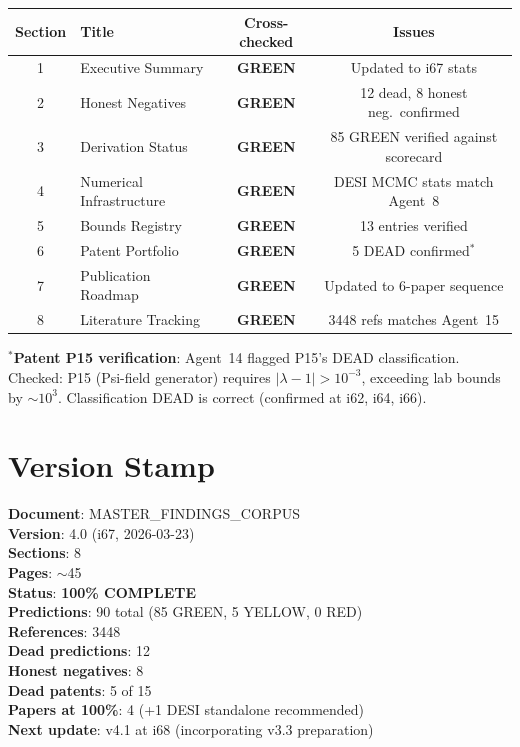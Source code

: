 \documentclass[11pt,a4paper]{article}
\newcommand{\GREEN}{\textcolor{dfdgreen}{\textbf{GREEN}}}
\begin{document}
\begin{center}
\begin{longtable}{clcc}
\toprule
\textbf{Section} & \textbf{Title} & \textbf{Cross-checked} & \textbf{Issues} \\
\midrule
1 & Executive Summary & \GREEN & Updated to i67 stats \\
2 & Honest Negatives & \GREEN & 12 dead, 8 honest neg.\ confirmed \\
3 & Derivation Status & \GREEN & 85 GREEN verified against scorecard \\
4 & Numerical Infrastructure & \GREEN & DESI MCMC stats match Agent~8 \\
5 & Bounds Registry & \GREEN & 13 entries verified \\
6 & Patent Portfolio & \GREEN & 5 DEAD confirmed$^*$ \\
7 & Publication Roadmap & \GREEN & Updated to 6-paper sequence \\
8 & Literature Tracking & \GREEN & 3448 refs matches Agent~15 \\
\bottomrule
\end{longtable}
\end{center}

$^*$\textbf{Patent P15 verification}: Agent~14 flagged P15's DEAD classification. Checked: P15 (Psi-field generator) requires $|\lambda - 1| > 10^{-3}$, exceeding lab bounds by $\sim 10^3$. Classification DEAD is correct (confirmed at i62, i64, i66).

\section{Version Stamp}

\begin{tcolorbox}[colback=gray!5!white,colframe=gray!40!black,title=Master Findings v4.0]
\textbf{Document}: MASTER\_FINDINGS\_CORPUS \\
\textbf{Version}: 4.0 (i67, 2026-03-23) \\
\textbf{Sections}: 8 \\
\textbf{Pages}: $\sim$45 \\
\textbf{Status}: \textbf{100\% COMPLETE} \\
\textbf{Predictions}: 90 total (85 GREEN, 5 YELLOW, 0 RED) \\
\textbf{References}: 3448 \\
\textbf{Dead predictions}: 12 \\
\textbf{Honest negatives}: 8 \\
\textbf{Dead patents}: 5 of 15 \\
\textbf{Papers at 100\%}: 4 (+1 DESI standalone recommended) \\
\textbf{Next update}: v4.1 at i68 (incorporating v3.3 preparation)
\end{tcolorbox}
\end{document}
